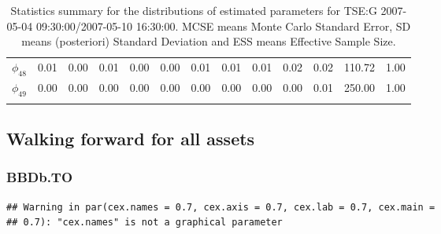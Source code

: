 \documentclass[]{article}
\begin{document}
\begin{table}[ht]
\begin{tabularx}{\textwidth}{lRRRRRRRRRRRR}
  $\phi_{48}$ & 0.01 & 0.00 & 0.01 & 0.00 & 0.00 & 0.01 & 0.01 & 0.01 & 0.02 & 0.02 & 110.72 & 1.00 \\ 
  $\phi_{49}$ & 0.00 & 0.00 & 0.00 & 0.00 & 0.00 & 0.00 & 0.00 & 0.00 & 0.00 & 0.01 & 250.00 & 1.00 \\ 
   \bottomrule
{}\\
\end{tabularx}
\endgroup
\caption{Statistics summary for the distributions of 
                   estimated parameters for TSE:G 2007-05-04 
                   09:30:00/2007-05-10 16:30:00. MCSE means Monte Carlo 
                   Standard Error, SD means (posteriori) Standard Deviation 
                   and ESS means Effective Sample Size.} 
\label{tab:tseg-ins-appendix-summary}
\end{table}

\newpage

\subsection{Walking forward for all
assets}\label{walking-forward-for-all-assets}

\subsubsection{BBDb.TO}\label{bbdb.to}

\begin{verbatim}
## Warning in par(cex.names = 0.7, cex.axis = 0.7, cex.lab = 0.7, cex.main =
## 0.7): "cex.names" is not a graphical parameter
\end{verbatim}
\end{document}
